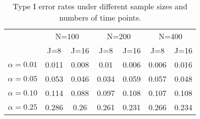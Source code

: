 \begin{table}[htbp]
\begin{center}
\caption{Type I error rates under different sample sizes and
numbers of time points.}
\begin{tabular}{c|cccccc}
 &  \multicolumn{2}{c}{N=100}  & \multicolumn{2}{c}{N=200} & \multicolumn{2}{c}{N=400} \\
& J=8& J=16&  J=8&J=16 &J=8&J=16\\
$\alpha=0.01$&0.011 &0.008 &0.01  &0.006 &0.006&0.016\\
$\alpha=0.05$&0.053 &0.046 &0.034  &0.059 &0.057&0.048\\
$\alpha=0.10$&0.114 & 0.088& 0.097 &0.108 &0.107&0.108\\
$\alpha=0.25$&0.286 & 0.26& 0.261 &0.231 &0.266&0.234\\
      
\end{tabular}
\end{center}
\end{table}
